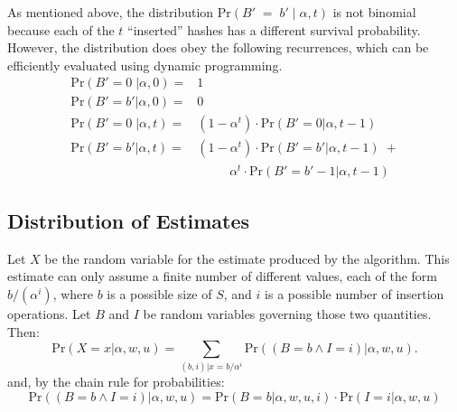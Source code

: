 \documentclass{sig-alternate}
\begin{document}
\noindent As mentioned above, the distribution $\mathrm{Pr}(B'\;=\; b' \;|\; \alpha, t)$ is not binomial
because each of the $t$ ``inserted'' hashes has a different survival probability.
However, the distribution does obey the following recurrences, which can be efficiently evaluated
using dynamic programming.
\begin{align}
\mathrm{Pr}(B' \!=\! 0 \;| \alpha, 0) = & 1 \\
\mathrm{Pr}(B' \!=\! b' | \alpha,  0) = & 0 \\
\mathrm{Pr}(B' \!=\! 0 \;| \alpha, t) = & (1 - \alpha^t) \cdot \mathrm{Pr}(B' \!=\! 0 | \alpha, t\!-\!1) \\
\mathrm{Pr}(B' \!=\! b' | \alpha,  t) = & (1 - \alpha^t) \cdot \mathrm{Pr}(B' \!=\! b' | \alpha, t\!-\!1) \; + \\
                                        & \quad \quad \;\; \alpha^t \cdot \mathrm{Pr}(B' \!=\! b'\!-\!1 | \alpha, t\!-\!1) 
\end{align}


\subsection{Distribution of Estimates}

Let $X$ be the random variable for the estimate produced by the algorithm. This estimate can only
assume a finite number of different values, each of the form $b/(\alpha^i)$, where $b$ is a possible
size of $S$, and $i$ is a possible number of insertion operations. Let $B$ and $I$ be random
variables governing those two quantities. Then:
\[
\mathrm{Pr}(X = x | \alpha, w, u) =  \sum_{(b,i)|x=b/\alpha^i} \mathrm{Pr}((B\!=\!b \wedge I\!=\!i) | \alpha, w, u).
\]
and, by the chain rule for probabilities:
\[
\mathrm{Pr}((B\!=\!b \wedge I\!=\!i) | \alpha, w, u) =
\mathrm{Pr}(B\!=\!b | \alpha, w, u, i) \cdot
\mathrm{Pr}(I\!=\!i | \alpha, w, u) 
\]
\end{document}
